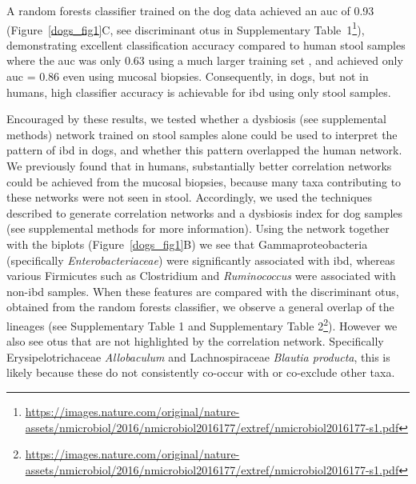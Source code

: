 A random forests classifier \cite{RN3729} trained on the dog data achieved an \gls{auc} of 0.93 (Figure~\ref{dogs_fig1}C, see discriminant \glspl{otu} in Supplementary Table~1\footnote{\url{https://images.nature.com/original/nature-assets/nmicrobiol/2016/nmicrobiol2016177/extref/nmicrobiol2016177-s1.pdf}}), demonstrating excellent classification accuracy compared to human stool samples where the \gls{auc} was only 0.63 using a much larger training set \cite{RN154}, and achieved only \gls{auc} = 0.86 even using mucosal biopsies. Consequently, in dogs, but not in humans, high classifier accuracy is achievable for \gls{ibd} using only stool samples.

Encouraged by these results, we tested whether a dysbiosis (see supplemental methods) network trained on stool samples alone could be used to interpret the pattern of \gls{ibd} in dogs, and whether this pattern overlapped the human network. We previously found that in humans, substantially better correlation networks could be achieved from the mucosal biopsies, because many taxa contributing to these networks were not seen in stool. Accordingly, we used the techniques described \cite{RN154} to generate correlation networks and a dysbiosis index for dog samples (see supplemental methods for more information). Using the network together with the biplots (Figure~\ref{dogs_fig1}B) we see that Gammaproteobacteria (specifically \textit{Enterobacteriaceae}) were significantly associated with \gls{ibd}, whereas various Firmicutes such as Clostridium and \textit{Ruminococcus} were associated with non-\gls{ibd} samples. When these features are compared with the discriminant \glspl{otu}, obtained from the random forests classifier, we observe a general overlap of the lineages (see Supplementary Table 1 and Supplementary Table 2\footnote{\label{sup}\url{https://images.nature.com/original/nature-assets/nmicrobiol/2016/nmicrobiol2016177/extref/nmicrobiol2016177-s1.pdf}}). However we also see \glspl{otu} that are not highlighted by the correlation network. Specifically Erysipelotrichaceae \textit{Allobaculum} and Lachnospiraceae \textit{Blautia producta}, this is likely because these do not consistently co-occur with or co-exclude other taxa.

